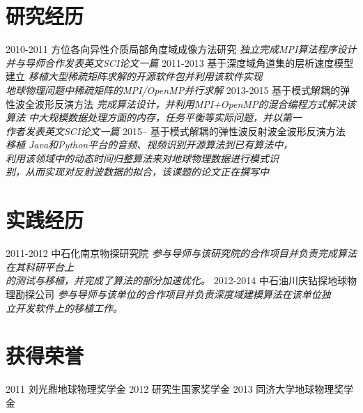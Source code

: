 \documentclass[]{friggeri-cvblackwhite}
\begin{document}
\section{研究经历}

\begin{entrylist}
  \entry
    {2010-2011}
    {方位各向异性介质局部角度域成像方法研究}
	{\emph{独立完成MPI算法程序设计并与导师合作发表英文SCI论文一篇}}
  \entry
    {2011-2013}
    {基于深度域角道集的层析速度模型建立}
    {\emph{移植大型稀疏矩阵求解的开源软件包并利用该软件实现\\
	地球物理问题中稀疏矩阵的MPI/OpenMP并行求解}}
  \entry
    {2013-2015}
    {基于模式解耦的弹性波全波形反演方法}
    {\emph{
		完成算法设计，并利用MPI+OpenMP的混合编程方式解决该算法
		中大规模数据处理方面的内存，任务平衡等实际问题，并以第一\\
		作者发表英文SCI论文一篇
	}}
  \entry
    {2015--}
    {基于模式解耦的弹性波反射波全波形反演方法}
	{\emph{
		移植 Java和Python平台的音频、视频识别开源算法到已有算法中，\\
		利用该领域中的动态时间归整算法来对地球物理数据进行模式识\\
		别，从而实现对反射波数据的拟合，该课题的论文正在撰写中
	}}
\end{entrylist}

\section{实践经历}
\begin{entrylist}
  \entry
    {2011-2012}
    {中石化南京物探研究院}
	{\emph{
		参与导师与该研究院的合作项目并负责完成算法在其科研平台上\\
		的测试与移植，并完成了算法的部分加速优化。
	}}
  \entry
    {2012-2014}
    {中石油川庆钻探地球物理勘探公司}
	{\emph{
		参与导师与该单位的合作项目并负责深度域建模算法在该单位独\\
		立开发软件上的移植工作。
	}}
\end{entrylist}
\section{获得荣誉}
\begin{entrylist}
  \entryTwo
    {2011}
    {刘光鼎地球物理奖学金}
  \entryTwo
    {2012}
	{研究生国家奖学金}
  \entryTwo
    {2013}
    {同济大学地球物理奖学金}
\par\vspace{\parskip}
\end{entrylist}
\end{document}
